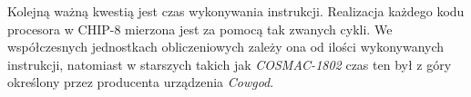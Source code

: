 Kolejną ważną kwestią jest czas wykonywania instrukcji. Realizacja każdego kodu procesora w CHIP-8 mierzona jest za pomocą tak zwanych cykli. We współczesnych jednostkach obliczeniowych zależy ona od ilości wykonywanych instrukcji, natomiast w starszych takich jak \textit{COSMAC-1802} czas ten był z góry określony przez producenta urządzenia \textit{Cowgod}. \\